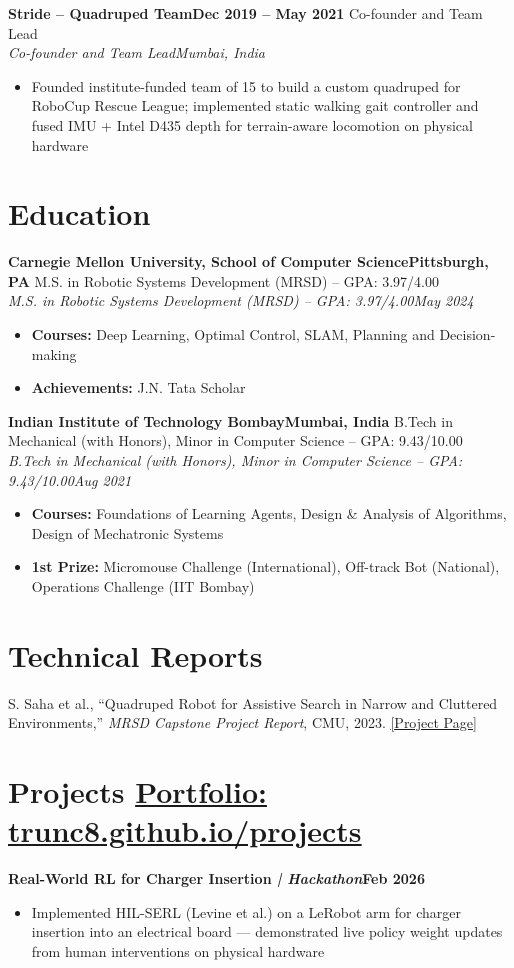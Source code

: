 \documentclass[letterpaper,10pt]{article}
\newcommand{\entry}[4]{%
  \vspace{3pt}%
  \noindent\textbf{#1}\hfill\textbf{#2}%
  \ifx\relax#3\relax\else\\%
    \noindent\textit{\small #3}\hfill\textit{\small #4}%
  \fi%
  \vspace{1pt}%
}
\newcommand{\resumeItemListStart}{\begin{itemize}[leftmargin=14pt, label=\textbullet, nosep, topsep=2pt, parsep=1pt]}
\newcommand{\resumeItemListEnd}{\end{itemize}}
\newcommand{\resumeItem}[1]{\item\small{#1}}
\begin{document}
\entry{Stride -- Quadruped Team}{Dec 2019 -- May 2021}
  {Co-founder and Team Lead}{Mumbai, India}
\resumeItemListStart
  \resumeItem{Founded institute-funded team of 15 to build a custom quadruped for RoboCup Rescue League; implemented static walking gait controller and fused IMU + Intel D435 depth for terrain-aware locomotion on physical hardware}
\resumeItemListEnd

\section{Education}

\entry{Carnegie Mellon University, School of Computer Science}{Pittsburgh, PA}
  {M.S. in Robotic Systems Development (MRSD) -- GPA: 3.97/4.00}{May 2024}
\resumeItemListStart
  \resumeItem{\textbf{Courses:} Deep Learning, Optimal Control, SLAM, Planning and Decision-making}
  \resumeItem{\textbf{Achievements:} J.N. Tata Scholar}
\resumeItemListEnd

\entry{Indian Institute of Technology Bombay}{Mumbai, India}
  {B.Tech in Mechanical (with Honors), Minor in Computer Science -- GPA: 9.43/10.00}{Aug 2021}
\resumeItemListStart
  \resumeItem{\textbf{Courses:} Foundations of Learning Agents, Design \& Analysis of Algorithms, Design of Mechatronic Systems}
  \resumeItem{\textbf{1st Prize:} Micromouse Challenge (International), Off-track Bot (National), Operations Challenge (IIT Bombay)}
\resumeItemListEnd

\section{Technical Reports}

\vspace{3pt}
\noindent\small
S. Saha et al., ``Quadruped Robot for Assistive Search in Narrow and Cluttered Environments,''
\textit{MRSD Capstone Project Report}, CMU, 2023.
\href{https://mrsdprojects.ri.cmu.edu/2023teamb/}{[Project Page]}

\section{Projects \hfill \normalfont\small\href{https://trunc8.github.io/projects}{Portfolio: trunc8.github.io/projects}}

\entry{Real-World RL for Charger Insertion {\normalfont\textit{| Hackathon}}}{Feb 2026}{}{}
\resumeItemListStart
  \resumeItem{Implemented HIL-SERL (Levine et al.) on a LeRobot arm for charger insertion into an electrical board --- demonstrated live policy weight updates from human interventions on physical hardware}
\resumeItemListEnd
\end{document}
